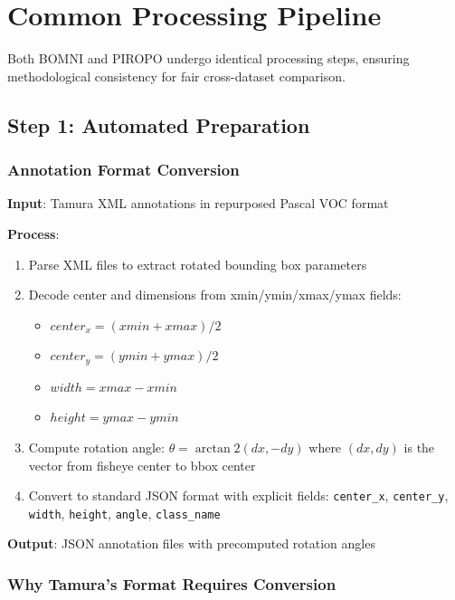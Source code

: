 \documentclass[11pt]{article}
\begin{document}
\section{Common Processing Pipeline}

Both BOMNI and PIROPO undergo identical processing steps, ensuring methodological consistency for fair cross-dataset comparison.

\subsection{Step 1: Automated Preparation}

\subsubsection{Annotation Format Conversion}

\textbf{Input}: Tamura XML annotations in repurposed Pascal VOC format

\textbf{Process}:
\begin{enumerate}[leftmargin=*]
    \item Parse XML files to extract rotated bounding box parameters
    \item Decode center and dimensions from xmin/ymin/xmax/ymax fields:
        \begin{itemize}
            \item $center_x = (xmin + xmax) / 2$
            \item $center_y = (ymin + ymax) / 2$
            \item $width = xmax - xmin$
            \item $height = ymax - ymin$
        \end{itemize}
    \item Compute rotation angle: $\theta = \arctan2(dx, -dy)$ where $(dx, dy)$ is the vector from fisheye center to bbox center
    \item Convert to standard JSON format with explicit fields: \texttt{center\_x}, \texttt{center\_y}, \texttt{width}, \texttt{height}, \texttt{angle}, \texttt{class\_name}
\end{enumerate}

\textbf{Output}: JSON annotation files with precomputed rotation angles

\subsubsection{Why Tamura's Format Requires Conversion}
\end{document}
